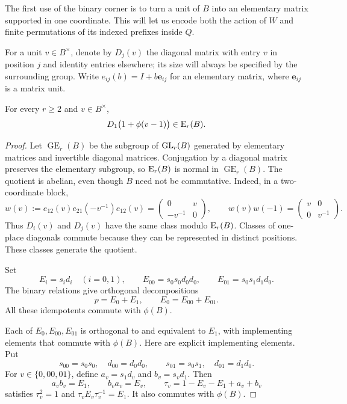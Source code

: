 The first use of the binary corner is to turn a unit of $B$ into an
elementary matrix supported in one coordinate.  This will let us encode
both the action of $W$ and finite permutations of its indexed prefixes
inside $Q$.

For a unit $v\in B^\times$, denote by $D_j(v)$ the diagonal matrix
with entry $v$ in position $j$ and identity entries elsewhere; its size
will always be specified by the surrounding group.  Write
$e_{ij}(b)=I+b\mathbf e_{ij}$ for an elementary matrix, where
$\mathbf e_{ij}$ is a matrix unit.

\begin{lemma}\label{lem:diagonal}
For every $r\ge2$ and $v\in B^\times$,
\[
 D_1\bigl(1+\phi(v-1)\bigr)\in\mathrm E_r(B).
\]
\end{lemma}

\begin{proof}
Let $\operatorname{GE}_r(B)$ be the subgroup of $\operatorname{GL}_r(B)$ generated
by elementary matrices and invertible diagonal matrices.  Conjugation
by a diagonal matrix preserves the elementary subgroup, so
$\mathrm E_r(B)$ is normal in $\operatorname{GE}_r(B)$.  The quotient is
abelian, even though $B$ need not be commutative.  Indeed, in a
two-coordinate block,
\[
 w(v):=e_{12}(v)e_{21}(-v^{-1})e_{12}(v)
   =\begin{pmatrix}0&v\\-v^{-1}&0\end{pmatrix},
 \qquad
 w(v)w(-1)=\begin{pmatrix}v&0\\0&v^{-1}\end{pmatrix}.
\]
Thus $D_i(v)$ and $D_j(v)$ have the same class modulo $\mathrm E_r(B)$.
Classes of one-place diagonals commute because they can be represented
in distinct positions.  These classes generate the quotient.

Set
\[
 E_i=s_i d_i\quad(i=0,1),
 \qquad
 E_{00}=s_0s_0d_0d_0,
 \qquad
 E_{01}=s_0s_1d_1d_0.
\]
The binary relations give orthogonal decompositions
\begin{equation}\label{eq:stage-four-corners}
 p=E_0+E_1,
 \qquad E_0=E_{00}+E_{01}.
\end{equation}
All these idempotents commute with $\phi(B)$.

Each of $E_0,E_{00},E_{01}$ is orthogonal to and equivalent to $E_1$,
with implementing elements that commute with $\phi(B)$.  Here are
explicit implementing elements.  Put
\[
 s_{00}=s_0s_0,\quad d_{00}=d_0d_0,
 \qquad
 s_{01}=s_0s_1,\quad d_{01}=d_1d_0.
\]
For $v\in\{0,00,01\}$, define
$a_v=s_1d_v$ and $b_v=s_vd_1$.  Then
\[
 a_vb_v=E_1,\qquad b_va_v=E_v,
 \qquad
 \tau_v=1-E_v-E_1+a_v+b_v
\]
satisfies $\tau_v^2=1$ and $\tau_vE_v\tau_v^{-1}=E_1$.
It also commutes with $\phi(B)$.


\end{proof}
